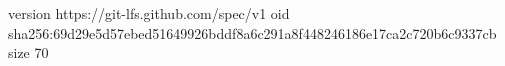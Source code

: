 version https://git-lfs.github.com/spec/v1
oid sha256:69d29e5d57ebed51649926bddf8a6c291a8f448246186e17ca2c720b6c9337cb
size 70
